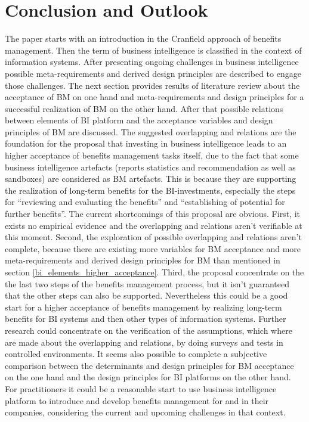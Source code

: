 \chapter{Conclusion and Outlook}
\label{conclusion_outlook}
The paper starts with an introduction in the Cranfield approach of benefits management. Then the term of business intelligence is classified in the context of information systems. After presenting ongoing challenges in business intelligence possible meta-requirements and derived design principles are described to engage those challenges. The next section provides results of literature review about the acceptance of BM on one hand and meta-requirements and design principles for a successful realization of BM on the other hand. After that possible relations between elements of BI platform and the acceptance variables and design principles of BM are discussed.
\newline\newline
The suggested overlapping and relations are the foundation for the proposal that investing in business intelligence leads to an higher acceptance of benefits management tasks itself, due to the fact that some business intelligence artefacts (reports statistics and recommendation as well as sandboxes) are considered as BM artefacts. This is because they are supporting the realization of long-term benefits for the BI-investments, especially the steps for ``reviewing and evaluating the benefits'' and ``establishing of potential for further benefits''. The current shortcomings of this proposal are obvious. First, it exists no empirical evidence and the overlapping and relations aren't verifiable at this moment. Second, the exploration of possible overlapping and relations aren't complete, because there are existing more variables for BM acceptance and more meta-requirements and derived design principles for BM than mentioned in section \ref{bi_elements_higher_acceptance}. Third, the proposal concentrate on the the last two steps of the benefits management process, but it isn't guaranteed that the other steps can also be supported. Nevertheless this could be a good start for a higher acceptance of benefits management by realizing long-term benefits for BI systems and then other types of information systems. 
\newline\newline
Further research could concentrate on the verification of the assumptions, which where are made about the overlapping and relations, by doing surveys and tests in controlled environments. It seems also possible to complete a subjective comparison between the determinants and design principles for BM acceptance on the one hand and the design principles for BI platforms on the other hand. For practitioners it could be a reasonable start to use business intelligence platform to introduce and develop benefits management for and in their companies, considering the current and upcoming challenges in that context.


